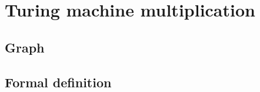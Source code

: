 \documentclass[11pt]{article}
\begin{document}
\date{}
\maketitle

\tableofcontents
\pagebreak

\section{Turing machine multiplication}
\subsection{Graph}
\begin{center}
\end{center}

\subsection{Formal definition}
\end{document}
